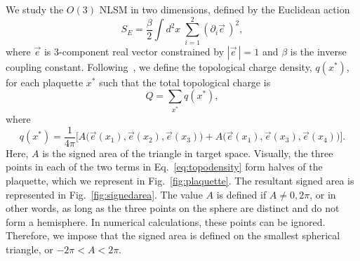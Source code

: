 \documentclass[a4paper,11pt]{article}
\newcommand{\e}{\vec e}
\begin{document}
We study the $O(3)$ NLSM in two dimensions, defined by the Euclidean action
\begin{equation*}
    \label{eq:nlsm euclidean action}
    S_E = \frac{\beta}{2} \int d^2x \; \sum_{i=1}^{2}\left(\partial_i \e\, \right)^2,
\end{equation*}
where $\e$ is 3-component real vector constrained by $|\e\,|=1$ and $\beta$ is the inverse coupling constant. Following~\cite{berg1981}, we define the topological charge density, $q(x^*)$, for each plaquette $x^*$ such that the total topological charge is
\begin{equation}
    Q = \sum_{x^*} q(x^*),
\end{equation}
where
\begin{equation}
  \label{eq:topodensity}
    q(x^*) = \frac{1}{4\pi} \bigg[A\Big(\e(x_1), \e(x_2), \e(x_3)\Big) + A\Big(\e(x_1), \e(x_3), \e(x_4)\Big) \bigg].
\end{equation}
Here, $A$ is the signed area of the triangle in target space. Visually, the three points in each of the two terms in Eq.~\ref{eq:topodensity} form halves of the plaquette, which we represent in Fig.~\ref{fig:plaquette}. The resultant signed area is represented in Fig.~\ref{fig:signedarea}. The value $A$ is defined if $A\neq 0, 2\pi$, or in other words, as long as the three points on the sphere are distinct and do not form a hemisphere. In numerical calculations, these points can be ignored. Therefore, we impose that the signed area is defined on the smallest spherical triangle, or $-2\pi < A < 2\pi$.
\end{document}
